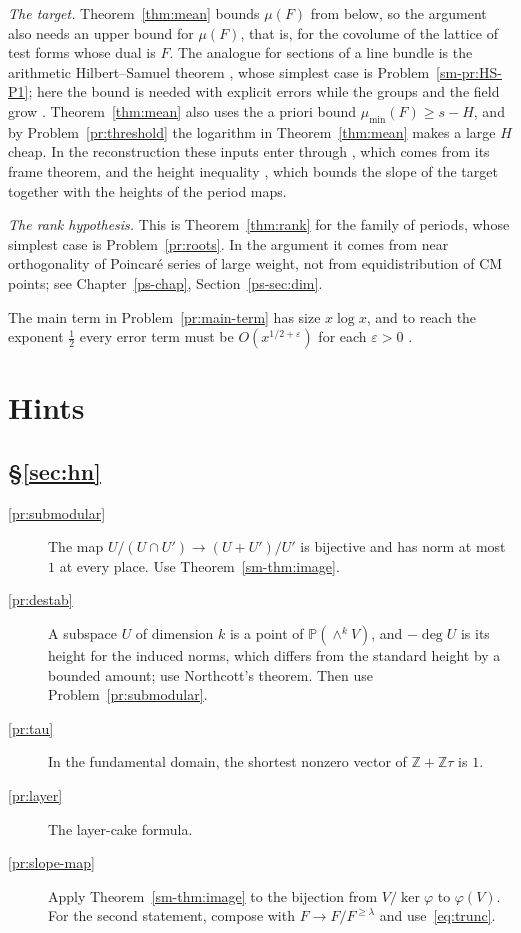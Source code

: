 \documentclass[reqno]{amsart}
\newcounter{chap}
\theoremstyle{definition}
\theoremstyle{plain}
\newcommand{\Z}{\mathbb{Z}}
\newcommand{\mumin}{\mu_{\min}}
\begin{document}
\emph{The target.}  Theorem~\ref{thm:mean} bounds \(\mu(F)\) from below, so the argument also needs an upper bound for \(\mu(F)\), that is, for the covolume of the lattice of test forms whose dual is \(F\).  The analogue for sections of a line bundle is the arithmetic Hilbert--Samuel theorem \cite[Thm.~8]{GS2}, whose simplest case is Problem~\ref{sm-pr:HS-P1}; here the bound is needed with explicit errors while the groups and the field grow \cite[\S15.4]{Adr}.  Theorem~\ref{thm:mean} also uses the a priori bound \(\mumin(F) \ge s - H\), and by Problem~\ref{pr:threshold} the logarithm in Theorem~\ref{thm:mean} makes a large \(H\) cheap.  In the reconstruction these inputs enter through \cite[(3.3)]{Adr}, which comes from its frame theorem, and the height inequality \cite[(3.4)]{Adr}, which bounds the slope of the target together with the heights of the period maps.

\emph{The rank hypothesis.}  This is Theorem~\ref{thm:rank} for the family of periods, whose simplest case is Problem~\ref{pr:roots}.  In the argument it comes from near orthogonality of Poincar\'e series of large weight, not from equidistribution of CM points; see Chapter~\ref{ps-chap}, Section~\ref{ps-sec:dim}.

The main term in Problem~\ref{pr:main-term} has size \(x\log x\), and to reach the exponent \(\tfrac12\) every error term must be \(O(x^{1/2+\varepsilon})\) for each \(\varepsilon > 0\) \cite[\S6 and Remark~6.2]{Zh}.

\section*{Hints}

\subsection*{\S\ref{sec:hn}}
\begin{description}
\item[\ref{pr:submodular}] The map \(U/(U \cap U') \to (U + U')/U'\) is bijective and has norm at most \(1\) at every place.  Use Theorem~\ref{sm-thm:image}.
\item[\ref{pr:destab}] A subspace \(U\) of dimension \(k\) is a point of \(\mathbb{P}(\wedge^k V)\), and \(-\deg U\) is its height for the induced norms, which differs from the standard height by a bounded amount; use Northcott's theorem.  Then use Problem~\ref{pr:submodular}.
\item[\ref{pr:tau}] In the fundamental domain, the shortest nonzero vector of \(\Z + \Z\tau\) is \(1\).
\item[\ref{pr:layer}] The layer-cake formula.
\item[\ref{pr:slope-map}] Apply Theorem~\ref{sm-thm:image} to the bijection from \(V/\ker\varphi\) to \(\varphi(V)\).  For the second statement, compose with \(F \to F/F^{\ge\lambda}\) and use~\eqref{eq:trunc}.
\end{description}
\end{document}
